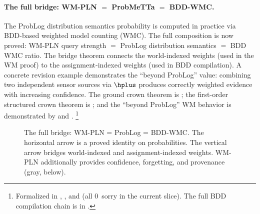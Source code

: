 \documentclass[11pt,openany]{report}
\begin{document}
\paragraph{The full bridge: WM-PLN $=$ ProbMeTTa $=$ BDD-WMC.}
The ProbLog distribution semantics probability is computed in
practice via BDD-based weighted model counting (WMC).  The full
composition is now proved: WM-PLN query strength $=$ ProbLog
distribution semantics $=$ BDD WMC ratio.  The bridge theorem
 connects the world-indexed
weights (used in the WM proof) to the assignment-indexed weights
(used in BDD compilation).  A concrete revision example
demonstrates the ``beyond ProbLog'' value: combining two
independent sensor sources via $\hplus$ produces correctly
weighted evidence with increasing confidence.  The ground crown theorem is
; the first-order structured crown
theorem is ; and the
``beyond ProbLog'' WM behavior is demonstrated by
 and .%
\footnote{Formalized in
,
, and
(all 0~sorry in the current slice).  The full BDD compilation chain
is in .}

\begin{figure}[htbp]
\centering
{}
\caption{The full bridge: WM-PLN = ProbLog = BDD-WMC.
  The horizontal arrow is a proved identity on probabilities.
  The vertical arrow bridges world-indexed and assignment-indexed
  weights.  WM-PLN additionally provides confidence, forgetting,
  and provenance (gray, below).}
\label{fig:problog-bridge}
\end{figure}
\end{document}
